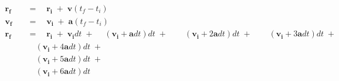 \documentclass[12pt, letterpaper]{article}
\renewcommand{\vec}[1]{\mathbf{#1}}
\begin{document}
\begin{alignat*} \vec{r_f} \quad &= \quad \vec{r_i} \; + \; \vec{v}(t_f - t_i) \\
    \vec{v_f} \quad &=  \quad   \vec{v_i} \; + \; \vec{a}(t_f - t_i) \\
    \vec{r_f} \quad &=  \quad   \vec{r_i} \; + \;  \vec{v_i}dt \; + \;
                        \quad (\vec{v_i} + \vec{a}dt)dt \; + \;
                    &   \quad (\vec{v_i} + 2\vec{a}dt)dt \; + \;
                    &   \quad (\vec{v_i} + 3\vec{a}dt)dt \; + \; \\
                    &   \quad (\vec{v_i} + 4\vec{a}dt)dt \; + \; \\
                    &   \quad (\vec{v_i} + 5\vec{a}dt)dt \; + \; \\
                    &   \quad (\vec{v_i} + 6\vec{a}dt)dt \\
\end{alignat*}
\end{document}
